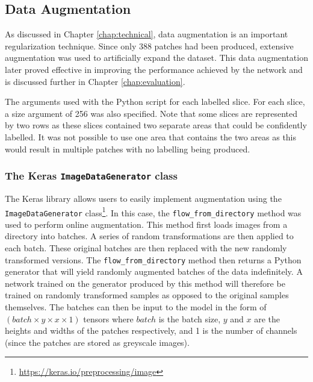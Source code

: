 \subsection{Data Augmentation}

As discussed in Chapter \ref{chap:technical}, data augmentation is an important regularization technique. Since only 388 patches had been produced, extensive augmentation was used to artificially expand the dataset. This data augmentation later proved effective in improving the performance achieved by the network and is discussed further in Chapter \ref{chap:evaluation}.

\begin{table}[!t]
\centering
\caption{The arguments used with the Python script for each labelled slice. For each slice, a size argument of 256 was also specified. Note that some slices are represented by two rows as these slices contained two separate areas that could be confidently labelled. It was not possible to use one area that contains the two areas as this would result in multiple patches with no labelling being produced.}

\label{tab:slidingwindow}
\end{table}

\subsubsection{The Keras \texttt{ImageDataGenerator} class}

The Keras library allows users to easily implement augmentation using the \texttt{ImageDataGenerator} class\footnote{\url{https://keras.io/preprocessing/image}}. In this case, the \texttt{flow\_from\_directory} method was used to perform online augmentation. This method first loads images from a directory into batches. A series of random transformations are then applied to each batch. These original batches are then replaced with the new randomly transformed versions. The \texttt{flow\_from\_directory} method then returns a Python generator that will yield randomly augmented batches of the data indefinitely. A network trained on the generator produced by this method will therefore be trained on randomly transformed samples as opposed to the original samples themselves. The batches can then be input to the model in the form of $(batch \times y \times x \times 1)$ tensors where $batch$ is the batch size, $y$ and $x$ are the heights and widths of the patches respectively, and 1 is the number of channels (since the patches are stored as greyscale images).

